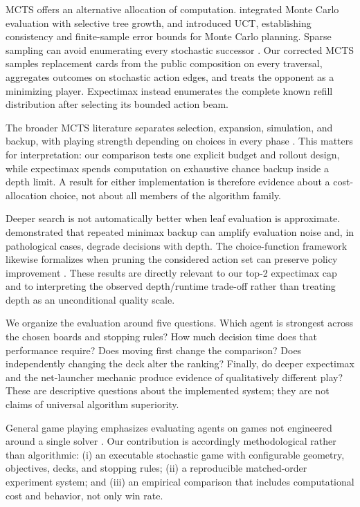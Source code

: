 \documentclass[letterpaper]{article} %
\begin{document}
MCTS offers an alternative allocation of computation. \citet{coulom2006} integrated Monte Carlo evaluation with selective tree growth, and \citet{kocsis2006} introduced UCT, establishing consistency and finite-sample error bounds for Monte Carlo planning. Sparse sampling can avoid enumerating every stochastic successor \citep{kearns1999}. Our corrected MCTS samples replacement cards from the public composition on every traversal, aggregates outcomes on stochastic action edges, and treats the opponent as a minimizing player. Expectimax instead enumerates the complete known refill distribution after selecting its bounded action beam.

The broader MCTS literature separates selection, expansion, simulation, and backup, with playing strength depending on choices in every phase \citep{browne2012}. This matters for interpretation: our comparison tests one explicit budget and rollout design, while expectimax spends computation on exhaustive chance backup inside a depth limit. A result for either implementation is therefore evidence about a cost-allocation choice, not about all members of the algorithm family.

Deeper search is not automatically better when leaf evaluation is approximate. \citet{pearl1983} demonstrated that repeated minimax backup can amplify evaluation noise and, in pathological cases, degrade decisions with depth. The choice-function framework likewise formalizes when pruning the considered action set can preserve policy improvement \citep{issakkimuthu2020}. These results are directly relevant to our top-2 expectimax cap and to interpreting the observed depth/runtime trade-off rather than treating depth as an unconditional quality scale.

We organize the evaluation around five questions. Which agent is strongest across the chosen boards and stopping rules? How much decision time does that performance require? Does moving first change the comparison? Does independently changing the deck alter the ranking? Finally, do deeper expectimax and the net-launcher mechanic produce evidence of qualitatively different play? These are descriptive questions about the implemented system; they are not claims of universal algorithm superiority.

General game playing emphasizes evaluating agents on games not engineered around a single solver \citep{genesereth2005}. Our contribution is accordingly methodological rather than algorithmic: (i) an executable stochastic game with configurable geometry, objectives, decks, and stopping rules; (ii) a reproducible matched-order experiment system; and (iii) an empirical comparison that includes computational cost and behavior, not only win rate.
\end{document}
